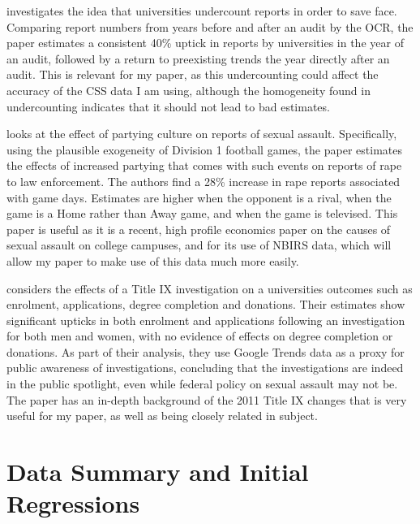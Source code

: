 \documentclass[AER]{AEA}
\begin{document}
 investigates the idea that universities undercount reports in order to save face.  Comparing report numbers from years before and after an audit by the OCR, the paper estimates a consistent 40\% uptick in reports by universities in the year of an audit, followed by a return to preexisting trends the year directly after an audit. This is relevant for my paper, as this undercounting could affect the accuracy of the CSS data I am using, although the homogeneity found in undercounting indicates that it should not lead to bad estimates.

 looks at the effect of partying culture on reports of sexual assault. Specifically, using the plausible exogeneity of Division 1 football games, the paper estimates the effects of increased partying that comes with such events on reports of rape to law enforcement. The authors find a 28\% increase in rape reports associated with game days. Estimates are higher when the opponent is a rival, when the game is a Home rather than Away game, and when the game is televised. This paper is useful as it is a recent, high profile economics paper on the causes of sexual assault on college campuses, and for its use of NBIRS data, which will allow my paper to make use of this data much more easily.

 considers the effects of a Title IX investigation on a universities outcomes such as enrolment, applications, degree completion and donations. Their estimates show significant upticks in both enrolment and applications following an investigation for both men and women, with no evidence of effects on degree completion or donations. As part of their analysis, they use Google Trends data as a proxy for public awareness of investigations, concluding that the investigations are indeed in the public spotlight, even while federal policy on sexual assault may not be. The paper has an in-depth background of the 2011 Title IX changes that is very useful for my paper, as well as being closely related in subject. 

\section{Data Summary and Initial Regressions}
\end{document}
